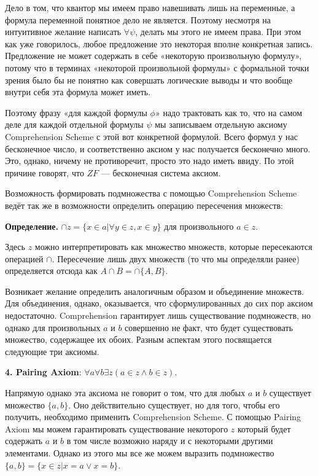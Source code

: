 Дело в том, что квантор мы имеем право навешивать лишь на переменные, а формула переменной понятное дело не является. Поэтому несмотря на интуитивное желание написать $\forall\psi$, делать мы этого не имеем права. При этом как уже говорилось, любое предложение это некоторая вполне конкретная запись. Предложение не может содержать в себе «некоторую произвольную формулу», потому что в терминах «некоторой произвольной формулы» с формальной точки зрения было бы не понятно как совершать логические выводы и что вообще внутри себя эта формула может иметь.

Поэтому фразу «для каждой формулы $\phi$» надо трактовать как то, что на самом деле для каждой отдельной формулы $\psi$ мы записываем отдельную аксиому Comprehension Scheme с этой вот конкретной формулой. Всего формул у нас бесконечное число, и соответственно аксиом у нас получается бесконечно много. Это, однако, ничему не противоречит, просто это надо иметь ввиду. По этой причине говорят, что $ZF$ — бесконечная система аксиом.

Возможность формировать подмножества с помощью Comprehension Scheme ведёт так же в возможности определить операцию пересечения множеств:

{\bfseries Определение. }$\cap z = \{x \in a| \forall y \in z, x\in y\}$ для произвольного $a \in z$.

Здесь $z$ можно интерпретировать как множество множеств, которые пересекаются операцией $\cap$. Пересечение лишь двух множеств (то что мы определяли ранее) определяется отсюда как $A\cap B = \cap\{A, B\}$.

Возникает желание определить аналогичным образом и объединение множеств. Для объединения, однако, оказывается, что сформулированных до сих пор аксиом недостаточно. Comprehension гарантирует лишь существование подмножеств, но однако для произвольных $a$ и $b$ совершенно не факт, что будет существовать множество, содержащее их обоих. Разным аспектам этого посвящается следующие три аксиомы.

{\bfseries 4. Pairing Axiom}: $\forall a \forall b \exists z (a\in z \wedge b \in z)$.

Напрямую однако эта аксиома не говорит о том, что для любых $a$ и $b$ существует множество $\{a, b\}$. Оно действительно существует, но для того, чтобы его получить, необходимо применить Comprehension Scheme. С помощью Pairing Axiom мы можем гарантировать существование некоторого $z$ который будет содержать $a$ и $b$ в том числе возможно наряду и с некоторыми другими элементами. Однако из этого мы все же можем выразить подмножество $\{a, b\} = \{x \in z| x = a \vee x = b\}$.

